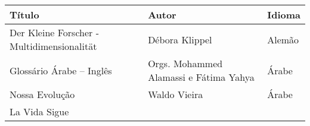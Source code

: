 \documentclass{gescons}
\begin{document}
\begin{longtable}[]{@{}
  >{\raggedright\arraybackslash}p{}
  >{\raggedright\arraybackslash}p{}
  >{\raggedright\arraybackslash}p{}@{}}
\toprule\noalign{}
\begin{minipage}[b]{\linewidth}\centering
\textbf{Título}
\end{minipage} & \begin{minipage}[b]{\linewidth}\centering
\textbf{Autor}
\end{minipage} & \begin{minipage}[b]{\linewidth}\centering
\textbf{Idioma}
\end{minipage} \\
\hline
\begin{minipage}[b]{\linewidth}\raggedright
Der Kleine Forscher - Multidimensionalität
\end{minipage} & \begin{minipage}[b]{\linewidth}\raggedright
Débora Klippel
\end{minipage} & \begin{minipage}[b]{\linewidth}\raggedright
Alemão
\end{minipage} \\
\hline
\begin{minipage}[b]{\linewidth}\raggedright
Glossário Árabe -- Inglês
\end{minipage} & \begin{minipage}[b]{\linewidth}\raggedright\addlinespace[2pt]
Orgs. Mohammed Alamassi e Fátima Yahya
\end{minipage} & \begin{minipage}[b]{\linewidth}\raggedright
Árabe
\end{minipage} \\
\hline
\begin{minipage}[b]{\linewidth}\raggedright
Nossa Evolução
\end{minipage} & \begin{minipage}[b]{\linewidth}\raggedright
Waldo Vieira
\end{minipage} & \begin{minipage}[b]{\linewidth}\raggedright
Árabe
\end{minipage} \\
\hline
\begin{minipage}[b]{\linewidth}\raggedright
La Vida Sigue
\end{minipage} & \begin{minipage}[b]{\linewidth}\raggedright

\end{minipage}
\end{longtable}
\end{document}
